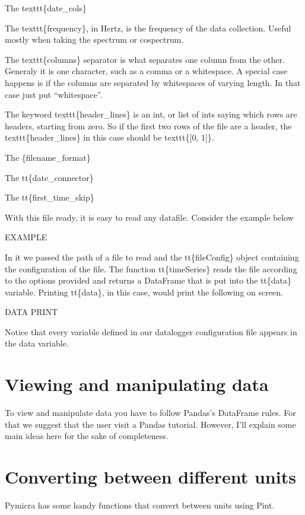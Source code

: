 \documentclass[a4paper,10pt,oneside]{sphinxmanual}
\begin{document}
The texttt\{date\_cols\}

The texttt\{frequency\}, in Hertz, is the frequency of the data collection.
Useful mostly when taking the spectrum or cospectrum.

The texttt\{columns\} separator is what separates one column from the other.
Generaly it is one character, such as a comma or a whitespace. A special case
happens is if the columns are separated by whitespaces of varying length. In
that case just put ``whitespace''.

The keyword texttt\{header\_lines\} is an int, or list of ints saying which rows
are headers, starting from zero. So if the first two rows of the file are a
header, the texttt\{header\_lines\} in this case should be texttt\{{[}0, 1{]}\}.

The \{filename\_format\}

The tt\{date\_connector\}

The tt\{first\_time\_skip\}

With this file ready, it is easy to read any datafile. Consider the example
below

EXAMPLE

In it we passed the path of a file to read and the tt\{fileConfig\} object
containing the configuration of the file. The function tt\{timeSeries\} reads the
file according to the options provided and returns a DataFrame that is put into
the tt\{data\} variable. Printing tt\{data\}, in this case, would print the
following on screen.

DATA PRINT

Notice that every variable defined in our datalogger configuration file appears in the
data variable.


\section{Viewing and manipulating data}
\label{tutorial:viewing-and-manipulating-data}
To view and manipulate data you have to follow Pandas's DataFrame rules. For
that we suggest that the user visit a Pandas tutorial. However, I'll explain
some main ideas here for the sake of completeness.


\section{Converting between different units}
\label{tutorial:converting-between-different-units}
Pymicra has some handy functions that convert between units using Pint.
\end{document}
